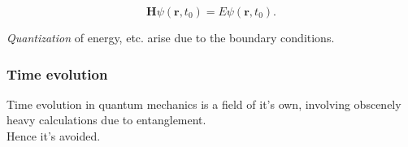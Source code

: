 \documentclass[
paper=128mm:96mm, %
fontsize=11pt, %
pagesize, %
parskip=half-, %
]{scrartcl} %
\theoremstyle{mythmstyle} %
\begin{document}
\begin{equation*}
 \mathbf{H}\psi(\mathbf{r}, t_0) = E\psi(\mathbf{r}, t_0).
\end{equation*}

\textit{Quantization} of energy, etc. arise due to the boundary conditions.

\clearpage

\subsubsection*{Time evolution}

Time evolution in quantum mechanics is a field of it's own, involving obscenely heavy calculations due to entanglement. \\

Hence it's avoided. \\

\clearpage

\end{document}
